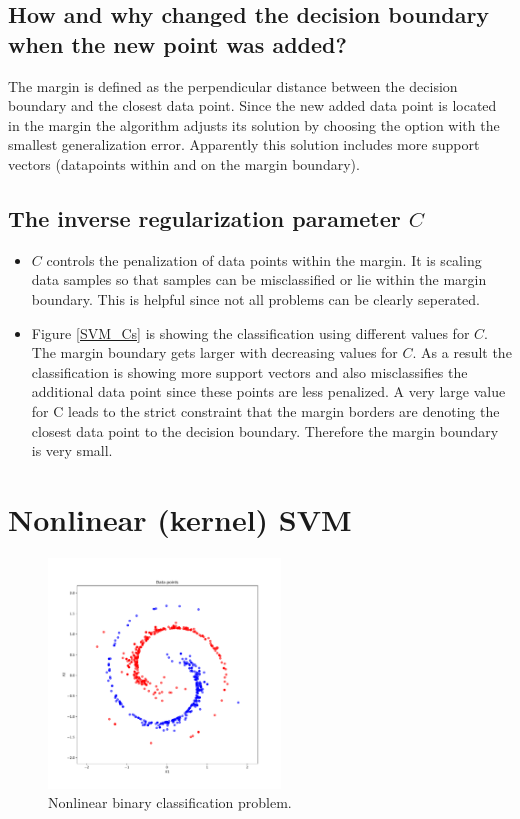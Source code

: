 \documentclass{article}
\begin{document}
\subsection{How and why changed the decision boundary when the new point was added?}

The margin is defined as the perpendicular distance between the decision boundary and the closest data point. Since the new added data point is located in the margin the algorithm adjusts its solution by choosing the option with the smallest generalization error. Apparently this solution includes more support vectors (datapoints within and on the margin boundary).

\subsection{The inverse regularization parameter $C$}

\begin{itemize}

	\item $C$ controls the penalization of data points within the margin. It is scaling data samples so that samples can be misclassified or lie within the margin boundary. This is helpful since not all problems can be clearly seperated.

	\item Figure \ref{SVM_Cs} is showing the classification using different values for $C$. The margin boundary gets larger with decreasing values for $C$. As a result the classification is showing more support vectors and also misclassifies the additional data point since these points are less penalized.
	    A very large value for C leads to the strict constraint that the margin borders are denoting the closest data point to the decision boundary. Therefore the margin boundary is very small.

\end{itemize}

\clearpage
\section{Nonlinear (kernel) SVM}

\begin{figure}[!ht]
\centering
\includegraphics[width=0.55\textwidth]{./Figures/2_data.pdf}
\caption{Nonlinear binary classification problem.}
\label{2_data}
\end{figure}
\end{document}

